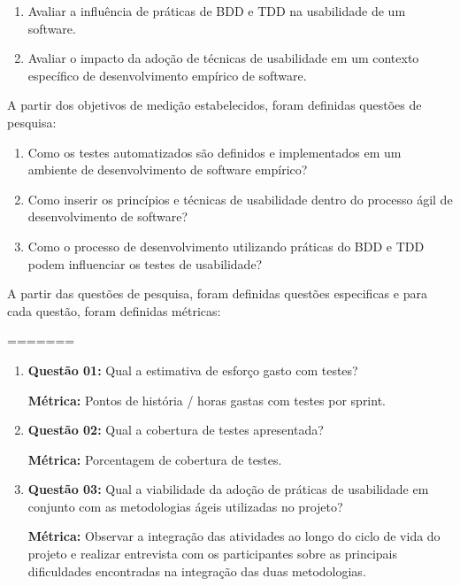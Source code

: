\begin{enumerate}
\item Avaliar a influência de práticas de BDD e TDD na usabilidade de um software. 

\item Avaliar o impacto da adoção de técnicas de usabilidade em um contexto específico de desenvolvimento empírico de software.
\end{enumerate}

A partir dos objetivos de medição estabelecidos, foram definidas questões de pesquisa:

\begin{enumerate}
\item Como os testes automatizados são definidos e implementados em um ambiente de desenvolvimento de software empírico?
\item Como inserir os princípios e técnicas de usabilidade dentro do processo ágil de desenvolvimento de software?
\item Como o processo de desenvolvimento utilizando práticas do BDD e TDD podem influenciar os testes de usabilidade?
\end{enumerate}

A partir das questões de pesquisa, foram definidas questões especificas e para cada questão, foram definidas métricas:

=======

\begin{enumerate}
\item \textbf{Questão 01: }Qual a estimativa de esforço gasto com testes?

	\textbf{Métrica: } Pontos de história / horas gastas com testes por sprint.

\item \textbf{Questão 02: }Qual a cobertura de testes apresentada?

	\textbf{Métrica: } Porcentagem de cobertura de testes.

\item \textbf{Questão 03: }Qual a viabilidade da adoção de práticas de usabilidade em conjunto com as metodologias ágeis utilizadas no projeto?

	\textbf{Métrica: } Observar a integração das atividades ao longo do ciclo de vida do projeto e realizar entrevista com os participantes sobre as principais dificuldades encontradas na integração das duas metodologias.
\end{enumerate}


